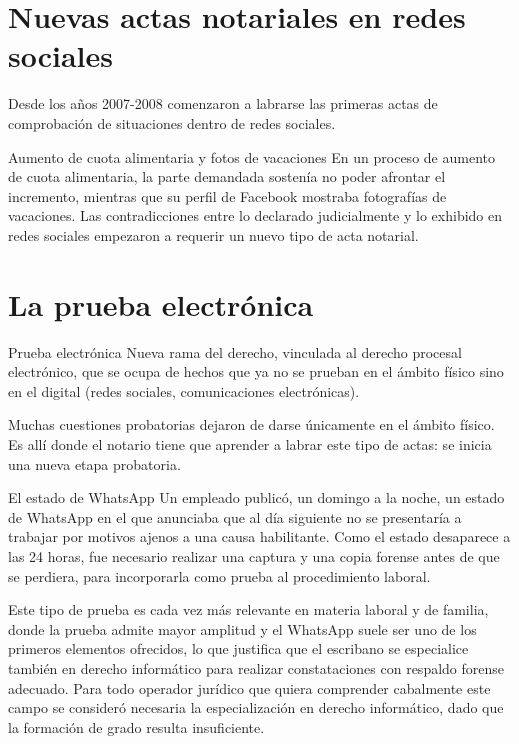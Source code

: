 \documentclass[12pt,oneside]{book}
\begin{document}
\section{Nuevas actas notariales en redes sociales}

Desde los años 2007-2008 comenzaron a labrarse las primeras actas de comprobación de situaciones dentro de redes sociales.

\begin{example}{Aumento de cuota alimentaria y fotos de vacaciones}
En un proceso de aumento de cuota alimentaria, la parte demandada sostenía no poder afrontar el incremento, mientras que su perfil de Facebook mostraba fotografías de vacaciones. Las contradicciones entre lo declarado judicialmente y lo exhibido en redes sociales empezaron a requerir un nuevo tipo de acta notarial.
\end{example}

\section{La prueba electrónica}

\begin{definition}{Prueba electrónica}
Nueva rama del derecho, vinculada al derecho procesal electrónico, que se ocupa de hechos que ya no se prueban en el ámbito físico sino en el digital (redes sociales, comunicaciones electrónicas).
\end{definition}

Muchas cuestiones probatorias dejaron de darse únicamente en el ámbito físico. Es allí donde el notario tiene que aprender a labrar este tipo de actas: se inicia una nueva etapa probatoria.

\begin{example}{El estado de WhatsApp}
Un empleado publicó, un domingo a la noche, un estado de WhatsApp en el que anunciaba que al día siguiente no se presentaría a trabajar por motivos ajenos a una causa habilitante. Como el estado desaparece a las 24 horas, fue necesario realizar una captura y una copia forense antes de que se perdiera, para incorporarla como prueba al procedimiento laboral.
\end{example}

Este tipo de prueba es cada vez más relevante en materia laboral y de familia, donde la prueba admite mayor amplitud y el WhatsApp suele ser uno de los primeros elementos ofrecidos, lo que justifica que el escribano se especialice también en derecho informático para realizar constataciones con respaldo forense adecuado. Para todo operador jurídico que quiera comprender cabalmente este campo se consideró necesaria la especialización en derecho informático, dado que la formación de grado resulta insuficiente.
\end{document}
